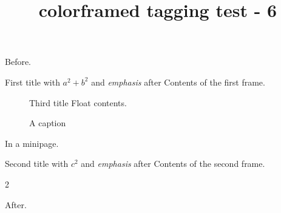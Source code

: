 \documentclass{article}
\title{colorframed tagging test - 6}
\begin{document}
Before.

\begin{titled-frame}{First title with $a^2+b^2$ and \emph{emphasis} after}
Contents of the first frame.
\end{titled-frame}

\begin{figure}
\begin{titled-frame}{Third title}
Float contents.
\end{titled-frame}
\caption{A caption}
\end{figure}

\noindent\begin{minipage}{6cm}
\begin{shaded}
In a minipage.
\end{shaded}
\end{minipage}

{\let\colorframedTitleBarFrame\TitleBarFrame
\begin{titled-frame}{Second title with $c^2$ and \emph{emphasis} after}
Contents of the second frame.
\end{titled-frame}
}

\begin{multicols}{2}
\kant[1]
\begin{framed}
\kant[2]
\end{framed}
\kant[3-6]
\end{multicols}

After.
\end{document}
